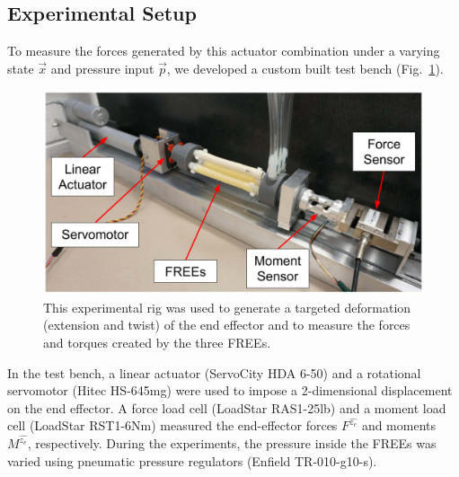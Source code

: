 \subsection{Experimental Setup}
To measure the forces generated by this actuator combination under a varying state $\vec{x}$ and pressure input $\vec{p}$, we developed a custom built test bench (Fig.~\ref{fig:rig}). 
%
\begin{figure}
    \centering
    \includegraphics[width=\linewidth]{figures/photos/rig_labeled2.jpg}
    \caption{This experimental rig was used to generate a targeted deformation (extension and twist) of the end effector and to measure the forces and torques created by the three FREEs.}
    \label{fig:rig}
\end{figure}
%
In the test bench, a linear actuator (ServoCity HDA 6-50) and a rotational servomotor (Hitec HS-645mg) were used to impose a 2-dimensional displacement on the end effector. 
A force load cell (LoadStar  RAS1-25lb) and a moment load cell (LoadStar RST1-6Nm) measured the end-effector forces $F^{\hat{z_e}}$ and moments $M^{\hat{z_e}}$, respectively.
During the experiments, the pressure inside the FREEs was varied using pneumatic pressure regulators (Enfield TR-010-g10-s). 

